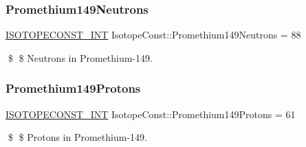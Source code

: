 \subsubsection{\texorpdfstring{Promethium149\+Neutrons}{Promethium149Neutrons}}
{\footnotesize\ttfamily \mbox{\hyperlink{group___isotope_const-_macros_ga5f18360b3e99483a35c32d789e62621c}{I\+S\+O\+T\+O\+P\+E\+C\+O\+N\+S\+T\+\_\+\+I\+NT}} Isotope\+Const\+::\+Promethium149\+Neutrons = 88}

\$ \$ Neutrons in Promethium-\/149. \mbox{\label{group___isotope_const-_promethium-_pm149_gaa1c5f990a80023211aec19a2a796bc1d}} 
\subsubsection{\texorpdfstring{Promethium149\+Protons}{Promethium149Protons}}
{\footnotesize\ttfamily \mbox{\hyperlink{group___isotope_const-_macros_ga5f18360b3e99483a35c32d789e62621c}{I\+S\+O\+T\+O\+P\+E\+C\+O\+N\+S\+T\+\_\+\+I\+NT}} Isotope\+Const\+::\+Promethium149\+Protons = 61}

\$ \$ Protons in Promethium-\/149. 